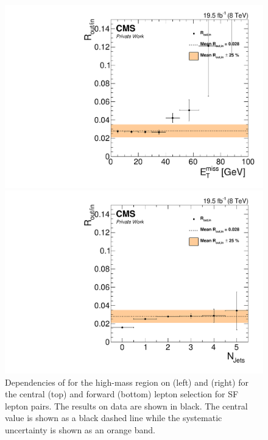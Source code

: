 \begin{figure}[htbp]
\begin{minipage}[t]{0.49\textwidth}
  \includegraphics[width=\textwidth]{plots/BG/rOutIn/rOutInSyst_DrellYanControlForward_Full2012_MET_HighMass_SF_None.pdf}
\end{minipage}
\begin{minipage}[t]{0.49\textwidth}
\includegraphics[width=\textwidth]{plots/BG/rOutIn/rOutInSyst_DrellYanControlForward_Full2012_NJets_HighMass_SF_None.pdf}
\end{minipage}
\caption{Dependencies of \Routin for the high-mass region on \MET (left) and \njets (right) for the central (top) and forward (bottom) lepton selection for SF lepton pairs. The results on data are shown in black. The central value is shown as a black dashed line while the systematic uncertainty is shown as an orange band.}
\label{fig:ROutInDependencies2}
\end{figure} 



